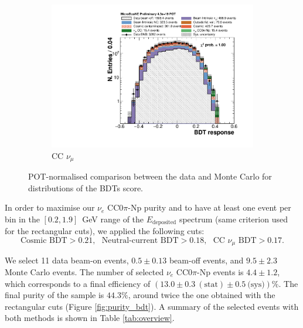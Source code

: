 \begin{figure}[htbp]
\begin{subfigure}{0.32\textwidth}
    \includegraphics[width=\linewidth]{figures/bdt_numu.pdf}
    \caption{CC $\nu_{\mu}$} 
  \end{subfigure}
  \caption{POT-normalised comparison between the data and Monte Carlo for distributions of the BDTs score.}\label{fig:bdt_datamc}
\end{figure}

In order to maximise our $\nu_e$ CC0$\pi$-Np purity and to have at least one event per bin in the $[0.2,1.9]$~GeV range of the $E_{\mathrm{deposited}}$ spectrum (same criterion used for the rectangular cuts), we applied the following cuts:
\begin{equation}
    \text{Cosmic BDT} > 0.21,~~~\text{Neutral-current BDT} > 0.18,~~~\text{CC }\nu_{\mu}\text{ BDT} > 0.17.
\end{equation}

We select 11 data beam-on events, $0.5\pm0.13$ beam-off events, and $9.5\pm2.3$ Monte Carlo events. The number of selected $\nu_e$ CC0$\pi$-Np events is $4.4\pm1.2$, which corresponds to a final efficiency of $(13.0\pm0.3~\mathrm{(stat)}\pm0.5~\text{(sys)})\%$. The final purity of the sample is $44.3\%$, around twice the one obtained with the rectangular cuts (Figure \ref{fig:purity_bdt}).
A summary of the selected events with both methods is shown in Table \ref{tab:overview}.

